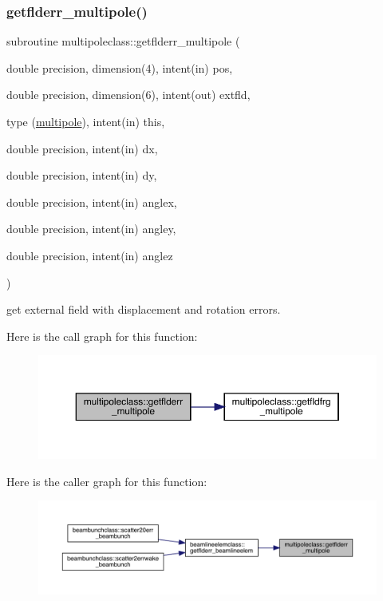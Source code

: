 \subsubsection{\texorpdfstring{getflderr\_multipole()}{getflderr\_multipole()}}
{\footnotesize\ttfamily subroutine multipoleclass\+::getflderr\+\_\+multipole (\begin{DoxyParamCaption}\item[{double precision, dimension(4), intent(in)}]{pos,  }\item[{double precision, dimension(6), intent(out)}]{extfld,  }\item[{type (\mbox{\hyperlink{namespacemultipoleclass_structmultipoleclass_1_1multipole}{multipole}}), intent(in)}]{this,  }\item[{double precision, intent(in)}]{dx,  }\item[{double precision, intent(in)}]{dy,  }\item[{double precision, intent(in)}]{anglex,  }\item[{double precision, intent(in)}]{angley,  }\item[{double precision, intent(in)}]{anglez }\end{DoxyParamCaption})}



get external field with displacement and rotation errors. 

Here is the call graph for this function\+:\nopagebreak
\begin{figure}[H]
\begin{center}
\leavevmode
\includegraphics[width=350pt]{namespacemultipoleclass_ade719df1a7d0e47f6495032cb64b1450_cgraph}
\end{center}
\end{figure}
Here is the caller graph for this function\+:\nopagebreak
\begin{figure}[H]
\begin{center}
\leavevmode
\includegraphics[width=350pt]{namespacemultipoleclass_ade719df1a7d0e47f6495032cb64b1450_icgraph}
\end{center}
\end{figure}
\mbox{\label{namespacemultipoleclass_a8712b7622d8ed7c0e71cdc18204dcf46}} 
